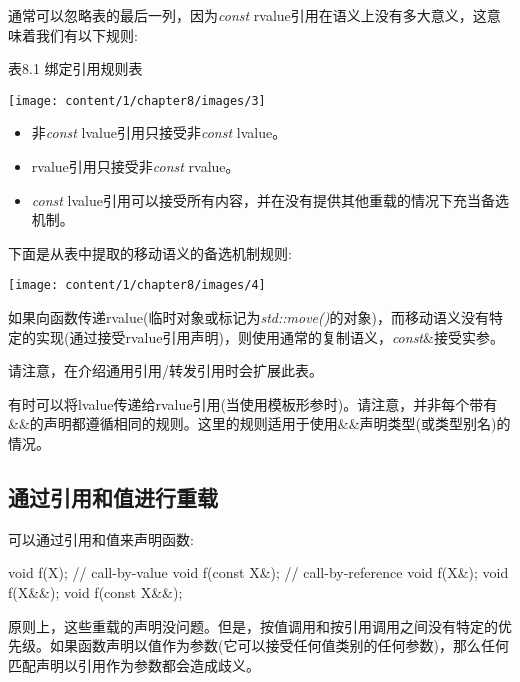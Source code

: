 通常可以忽略表的最后一列，因为\textit{const} rvalue引用在语义上没有多大意义，这意味着我们有以下规则:

\hspace*{\fill}  %
表8.1 绑定引用规则表

\begin{center}
	\texttt{[image: content/1/chapter8/images/3]}
\end{center}

\begin{itemize}
	\item 非\textit{const} lvalue引用只接受非\textit{const} lvalue。 
	\item rvalue引用只接受非\textit{const} rvalue。
	\item \textit{const} lvalue引用可以接受所有内容，并在没有提供其他重载的情况下充当备选机制。
\end{itemize}

下面是从表中提取的移动语义的备选机制规则:

\begin{center}
	\texttt{[image: content/1/chapter8/images/4]}
\end{center}

如果向函数传递rvalue(临时对象或标记为\textit{std::move()}的对象)，而移动语义没有特定的实现(通过接受rvalue引用声明)，则使用通常的复制语义，\textit{const}\&接受实参。

请注意，在介绍通用引用/转发引用时会扩展此表。

有时可以将lvalue传递给rvalue引用(当使用模板形参时)。请注意，并非每个带有\&\&的声明都遵循相同的规则。这里的规则适用于使用\&\&声明类型(或类型别名)的情况。

\subsection{通过引用和值进行重载}

可以通过引用和值来声明函数:

\begin{cppcode}
void f(X); // call-by-value
void f(const X&); // call-by-reference
void f(X&);
void f(X&&);
void f(const X&&);
\end{cppcode}

原则上，这些重载的声明没问题。但是，按值调用和按引用调用之间没有特定的优先级。如果函数声明以值作为参数(它可以接受任何值类别的任何参数)，那么任何匹配声明以引用作为参数都会造成歧义。

